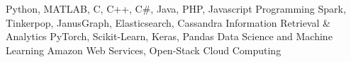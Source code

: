 
\begin{cventries}
  \cventryc
    {Python, MATLAB, C, C++, C\#, Java, PHP, Javascript}
    {Programming}
    {}
    {}
\cventryc
    {Spark, Tinkerpop, JanusGraph, Elasticsearch, Cassandra}
    {Information Retrieval \& Analytics}
    {}
    {}
\cventryc
    {PyTorch, Scikit-Learn, Keras, Pandas}
    {Data Science and Machine Learning}
    {}
    {}
\cventryc
    {Amazon Web Services, Open-Stack}
    {Cloud Computing}
    {}
    {}
\end{cventries}

